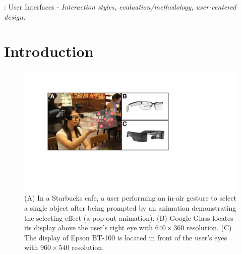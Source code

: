 \documentclass{sigchi}
\begin{document}

: User Interfaces - \emph{Interaction styles, evaluation/methodology, user-centered design.}



\section{Introduction}

 \begin{figure}[!h]
  \centering
  \includegraphics[width=1\columnwidth]{TopFigure.pdf}
  \caption{(A) In a Starbucks cafe, a user performing an in-air gesture to select a single object after being prompted by an animation demonstrating the selecting effect (a pop out animation). (B) Google Glass locates its display above the user's right eye with $640 \times 360$ resolution. (C) The display of Epson BT-100 is located in front of the user's eyes with $960 \times 540$ resolution.}
  \label{fig:TopFigure}
  \end{figure} 
\end{document}

